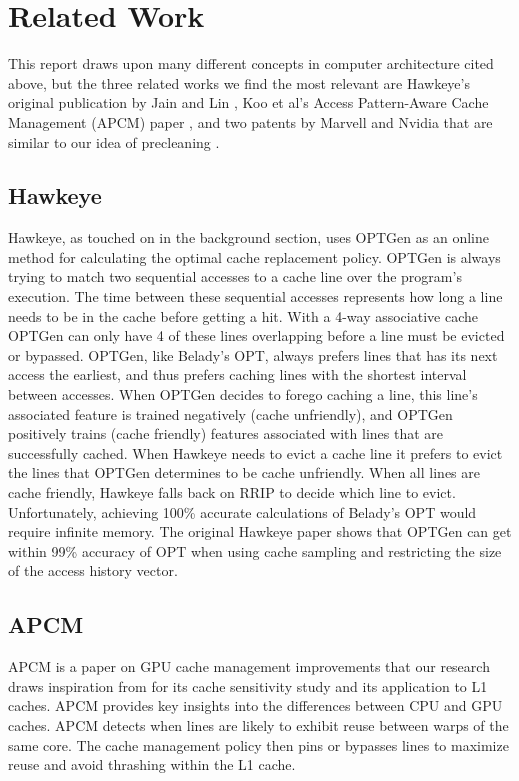 \chapter{Related Work}

This report draws upon many different concepts in computer architecture cited above, but the three related works we find the most relevant are Hawkeye’s original publication by Jain and Lin \cite{hawkeye}, Koo et al’s Access Pattern-Aware Cache Management (APCM) paper \cite{apcm}, and two patents by Marvell and Nvidia that are similar to our idea of precleaning \cite{preclean_cpu,preclean_nvidia_patent}.

\section{Hawkeye}
Hawkeye, as touched on in the background section, uses OPTGen as an online method for calculating the optimal cache replacement policy. OPTGen is always trying to match two sequential accesses to a cache line over the program's execution. The time between these sequential accesses represents how long a line needs to be in the cache before getting a hit. With a 4-way associative cache OPTGen can only have 4 of these lines overlapping before a line must be evicted or bypassed. OPTGen, like Belady’s OPT, always prefers lines that has its next access the earliest, and thus prefers caching lines with the shortest interval between accesses. When OPTGen decides to forego caching a line, this line’s associated feature is trained negatively (cache unfriendly), and OPTGen positively trains (cache friendly) features associated with lines that are successfully cached. When Hawkeye needs to evict a cache line it prefers to evict the lines that OPTGen determines to be cache unfriendly. When all lines are cache friendly, Hawkeye falls back on RRIP \cite{rrip} to decide which line to evict. Unfortunately, achieving 100\% accurate calculations of Belady's OPT would require infinite memory. The original Hawkeye paper shows that OPTGen can get within 99\% accuracy of OPT when using cache sampling and restricting the size of the access history vector.

\section{APCM}
APCM is a paper on GPU cache management improvements that our research draws inspiration from for its cache sensitivity study and its application to L1 caches. APCM provides key insights into the differences between CPU and GPU caches. APCM detects when lines are likely to exhibit reuse between warps of the same core. The cache management policy then pins or bypasses lines to maximize reuse and avoid thrashing within the L1 cache.

